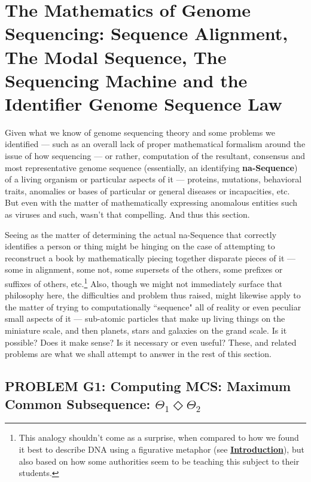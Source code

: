 \documentclass[a4paper, 18pt]{book} %
\begin{document}
\chapter{The Mathematics of Genome Sequencing: Sequence Alignment, The Modal Sequence, The Sequencing Machine and the Identifier Genome Sequence Law}
\label{SECMATHSEQ}

Given what we know of genome sequencing theory and some problems we identified --- such as an overall lack of proper mathematical formalism around the issue of how sequencing --- or rather, computation of the resultant, consensus and most representative genome sequence (essentially, an identifying \textbf{na-Sequence}) of a living organism or particular aspects of it --- proteins, mutations, behavioral traits, anomalies or bases of particular or general diseases or incapacities, etc. But even with the matter of mathematically expressing anomalous entities such as viruses and such, wasn't that compelling. And thus this section.

Seeing as the matter of determining the actual na-Sequence that correctly identifies a person or thing might be hinging on the case of attempting to reconstruct a book by mathematically piecing together disparate pieces of it --- some in alignment, some not, some supersets of the others, some prefixes or suffixes of others, etc.\footnote{This analogy shouldn't come as a surprise, when compared to how we found it best to describe DNA using a figurative metaphor (see \textbf{\hyperref[SEC1]{Introduction}}), but also based on how some authorities seem to be teaching this subject to their students\cite{przytycka_wgs_lecture10}.} Also, though we might not immediately surface that philosophy here, the difficulties and problem thus raised, might likewise apply to the matter of trying to computationally ``sequence" all of reality or even peculiar small aspects of it --- sub-atomic particles that make up living things on the miniature scale, and then planets, stars and galaxies on the grand scale. Is it possible? Does it make sense? Is it necessary or even useful? These, and related problems are what we shall attempt to answer in the rest of this section.

\section{PROBLEM G1: Computing MCS: Maximum Common Subsequence: $\Theta_1 \Diamond \Theta_2$}
\label{PROBG1}
\end{document}

